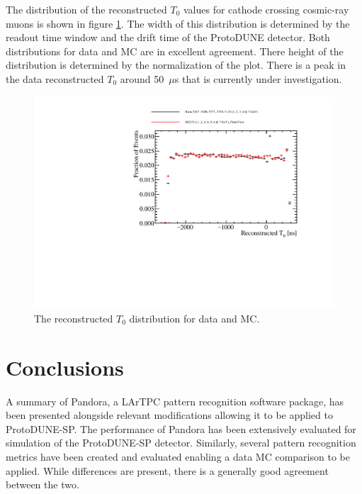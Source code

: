 The distribution of the reconstructed $T_{0}$ values for cathode crossing cosmic-ray muons is shown in figure \ref{fig:recoT0data}.  The width of this distribution is determined by the readout time window and the drift time of the ProtoDUNE detector.  Both distributions for data and MC are in excellent agreement.  There height of the distribution is determined by the normalization of the plot.  There is a peak in the data reconstructed $T_{0}$ around 50~$\mu$s that is currently under investigation.  %

\begin{figure}
\includegraphics[width=1.0\textwidth]{Figures/Metrics/Data/Cosmics/StitchedT0.pdf}
\caption{The reconstructed $T_{0}$ distribution for data and MC.}
\label{fig:recoT0data}
\end{figure}

\section{Conclusions}
A summary of Pandora, a LArTPC pattern recognition software package, has been presented alongside relevant modifications allowing it to be applied to ProtoDUNE-SP.  The performance of Pandora has been extensively evaluated for simulation of the ProtoDUNE-SP detector.  Similarly, several pattern recognition metrics have been created and evaluated enabling a data MC comparison to be applied.  While differences are present, there is a generally good agreement between the two.  

